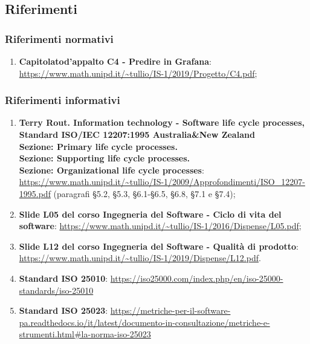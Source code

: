 \subsection{Riferimenti}
\subsubsection{Riferimenti normativi}
\begin{enumerate}
	\item \textbf{Capitolato}\glosp \textbf{d'appalto C4 - Predire in Grafana}\glo: \url{https://www.math.unipd.it/~tullio/IS-1/2019/Progetto/C4.pdf};
\end{enumerate}
\subsubsection{Riferimenti informativi}
\begin{enumerate}
	\item \textbf{Terry Rout. Information technology - Software life cycle processes, Standard ISO/IEC 12207:1995 Australia\&New Zealand \\ Sezione: Primary life cycle processes. \\ Sezione: Supporting life cycle processes. \\ Sezione: Organizational life cycle processes}: \url{https://www.math.unipd.it/~tullio/IS-1/2009/Approfondimenti/ISO_12207-1995.pdf} (paragrafi §5.2, §5.3, §6.1-§6.5, §6.8, §7.1 e §7.4);
	\item \textbf{Slide L05 del corso Ingegneria del Software - Ciclo di vita del software}: \url{https://www.math.unipd.it/~tullio/IS-1/2016/Dispense/L05.pdf};
	\item \textbf{Slide L12 del corso Ingegneria del Software - Qualità di prodotto}: \url{https://www.math.unipd.it/~tullio/IS-1/2019/Dispense/L12.pdf}.
	\item \textbf{Standard ISO 25010}:
	\url{https://iso25000.com/index.php/en/iso-25000-standards/iso-25010}
	\item \textbf{Standard ISO 25023}:
	\url{https://metriche-per-il-software-pa.readthedocs.io/it/latest/documento-in-consultazione/metriche-e-strumenti.html#la-norma-iso-25023}
	
	
	
	
	
	
\end{enumerate}


